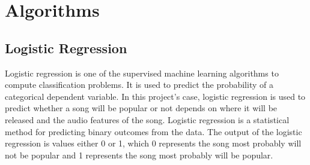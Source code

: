 \chapter{Algorithms}

\section{Logistic Regression}
Logistic regression is one of the supervised machine learning algorithms to
compute classification problems. It is used to predict the probability of a
categorical dependent variable. In this project's case, logistic regression is used to predict
whether a song will be popular or not depends on where it will be released and the 
audio features of the song. Logistic regression is a statistical method for 
predicting binary outcomes from the data. The output of the logistic regression is values
either 0 or 1, which 0 represents the song most probably will not be popular and 
1 represents the song most probably will be popular. \\

